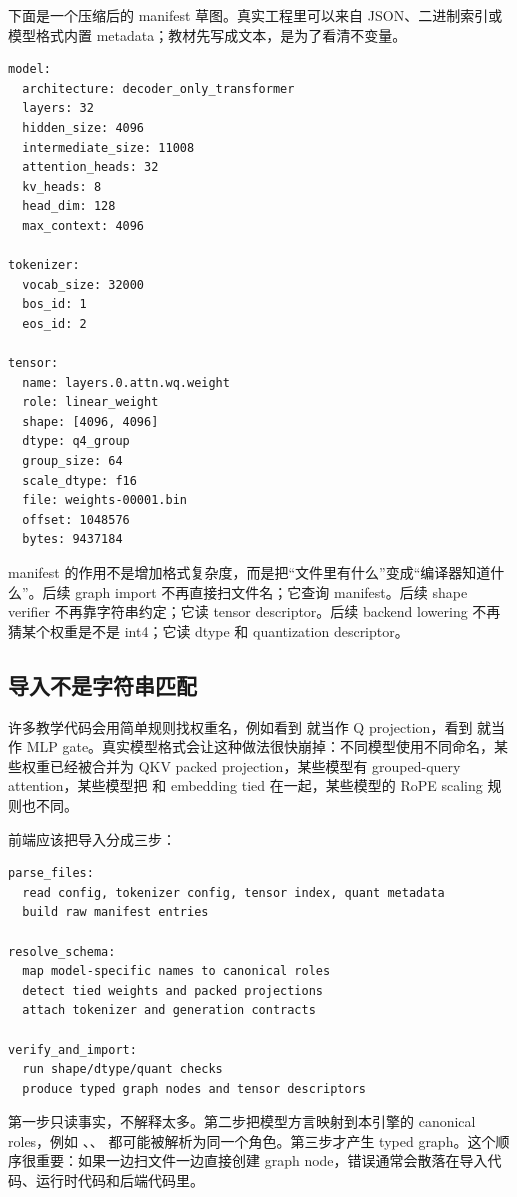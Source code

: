 下面是一个压缩后的 manifest 草图。真实工程里可以来自 JSON、二进制索引或模型格式内置 metadata；教材先写成文本，是为了看清不变量。

\begin{lstlisting}[numbers=none,caption={模型 manifest 的核心字段}]
model:
  architecture: decoder_only_transformer
  layers: 32
  hidden_size: 4096
  intermediate_size: 11008
  attention_heads: 32
  kv_heads: 8
  head_dim: 128
  max_context: 4096

tokenizer:
  vocab_size: 32000
  bos_id: 1
  eos_id: 2

tensor:
  name: layers.0.attn.wq.weight
  role: linear_weight
  shape: [4096, 4096]
  dtype: q4_group
  group_size: 64
  scale_dtype: f16
  file: weights-00001.bin
  offset: 1048576
  bytes: 9437184
\end{lstlisting}

manifest 的作用不是增加格式复杂度，而是把“文件里有什么”变成“编译器知道什么”。后续 graph import 不再直接扫文件名；它查询 manifest。后续 shape verifier 不再靠字符串约定；它读 tensor descriptor。后续 backend lowering 不再猜某个权重是不是 int4；它读 dtype 和 quantization descriptor。

\subsection{导入不是字符串匹配}

许多教学代码会用简单规则找权重名，例如看到  就当作 Q projection，看到  就当作 MLP gate。真实模型格式会让这种做法很快崩掉：不同模型使用不同命名，某些权重已经被合并为 QKV packed projection，某些模型有 grouped-query attention，某些模型把  和 embedding tied 在一起，某些模型的 RoPE scaling 规则也不同。

前端应该把导入分成三步：

\begin{lstlisting}[numbers=none,caption={模型导入的三阶段}]
parse_files:
  read config, tokenizer config, tensor index, quant metadata
  build raw manifest entries

resolve_schema:
  map model-specific names to canonical roles
  detect tied weights and packed projections
  attach tokenizer and generation contracts

verify_and_import:
  run shape/dtype/quant checks
  produce typed graph nodes and tensor descriptors
\end{lstlisting}

第一步只读事实，不解释太多。第二步把模型方言映射到本引擎的 canonical roles，例如 、、 都可能被解析为同一个角色。第三步才产生 typed graph。这个顺序很重要：如果一边扫文件一边直接创建 graph node，错误通常会散落在导入代码、运行时代码和后端代码里。

